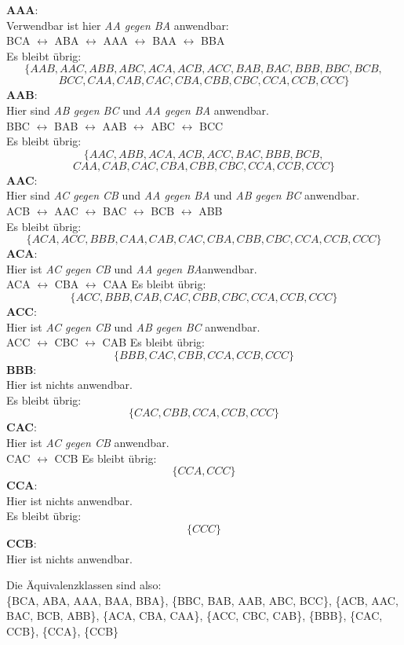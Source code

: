 \documentclass{article} %
\begin{document}
\begin{mybox}
\textbf{AAA}: \\
Verwendbar ist hier \textit{AA gegen BA} anwendbar: \\
 BCA $\leftrightarrow$ ABA $\leftrightarrow$ AAA $\leftrightarrow$ BAA $\leftrightarrow$ BBA\\
Es bleibt übrig: 
\[
\{AAB,AAC,ABB,ABC,ACA,ACB,ACC,BAB,BAC,BBB,BBC,BCB,
\]
\[BCC,CAA,CAB,CAC,CBA,CBB,CBC,CCA,CCB,CCC\}\]
\textbf{AAB}: \\
Hier sind \textit{AB gegen BC} und \textit{AA gegen BA} anwendbar. \\
BBC $\leftrightarrow$ BAB $\leftrightarrow$ AAB $\leftrightarrow$ ABC $\leftrightarrow$ BCC\\
Es bleibt übrig: 
\[
\{AAC,ABB,ACA,ACB,ACC,BAC,BBB,BCB,
\]
\[CAA,CAB,CAC,CBA,CBB,CBC,CCA,CCB,CCC\}\]
\textbf{AAC}: \\
Hier sind \textit{AC gegen CB} und \textit{AA gegen BA} und \textit{AB gegen BC} anwendbar. \\
ACB $\leftrightarrow$ AAC $\leftrightarrow$ BAC $\leftrightarrow$ BCB $\leftrightarrow$ ABB \\
Es bleibt übrig: 
\[
\{ACA,ACC,BBB,CAA,CAB,CAC,CBA,CBB,CBC,CCA,CCB,CCC\}
\]
\textbf{ACA}: \\
Hier ist \textit{AC gegen CB} und \textit{AA gegen BA}anwendbar. \\
ACA  $\leftrightarrow$ CBA $\leftrightarrow$ CAA
Es bleibt übrig: 
\[
\{ACC,BBB,CAB,CAC,CBB,CBC,CCA,CCB,CCC\}
\]
\textbf{ACC}: \\
Hier ist \textit{AC gegen CB} und \textit{AB gegen BC} anwendbar. \\
ACC  $\leftrightarrow$ CBC $\leftrightarrow$ CAB
Es bleibt übrig: 
\[
\{BBB,CAC,CBB,CCA,CCB,CCC\}
\]
\textbf{BBB}: \\
Hier ist nichts anwendbar. \\
Es bleibt übrig: 
\[
\{CAC,CBB,CCA,CCB,CCC\}
\]
\textbf{CAC}: \\
Hier ist \textit{AC gegen CB} anwendbar. \\
 CAC $\leftrightarrow$ CCB 
Es bleibt übrig: 
\[
\{CCA,CCC\}
\]
\textbf{CCA}: \\
Hier ist nichts anwendbar. \\
Es bleibt übrig: 
\[
\{CCC\}
\]
\textbf{CCB}: \\
Hier ist nichts anwendbar. \\ 

\end{mybox}
\begin{mybox}
Die Äquivalenzklassen sind also: \\
\{BCA, ABA, AAA, BAA, BBA\}, \{BBC, BAB, AAB, ABC, BCC\}, \{ACB, AAC, BAC, BCB, ABB\}, \{ACA, CBA, CAA\}, \{ACC, CBC, CAB\}, \{BBB\}, \{CAC, CCB\}, \{CCA\}, \{CCB\}
\end{mybox}
\end{document}
